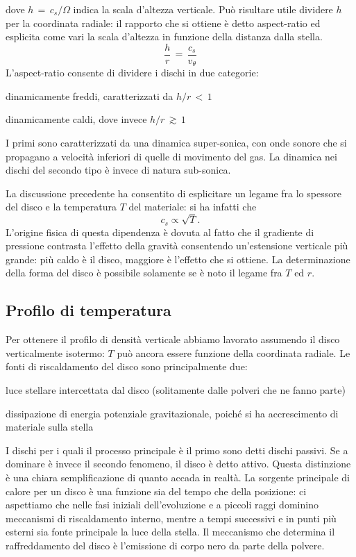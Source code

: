 dove $h\,=\,c_s/\Omega$ indica la scala d'altezza verticale. Può risultare utile dividere $h$ per la coordinata radiale: il rapporto che si ottiene è detto aspect-ratio ed esplicita come vari la scala d'altezza in funzione della distanza dalla stella.
\begin{equation}
\frac{h}{r}\,=\,\frac{c_s}{v_\theta}
\label{eq:aspect_ratio}
\end{equation}
L'aspect-ratio consente di dividere i dischi in due categorie:
\begin{list}{\textbf{-}}{\setlength{\itemsep}{0cm}}
    \item dinamicamente freddi, caratterizzati da $h/r\,<\,1$
    \item dinamicamente caldi, dove invece $h/r\,\gtrsim\,1$
\end{list}
I primi sono caratterizzati da una dinamica super-sonica, con onde sonore che si propagano a velocità inferiori di quelle di movimento del gas. La dinamica nei dischi del secondo tipo è invece di natura sub-sonica.

La discussione precedente ha consentito di esplicitare un legame fra lo spessore del disco e la temperatura $T$ del materiale: si ha infatti che
\begin{equation}
c_s \propto \sqrt{T}.
\label{eq:vsuono_T}
\end{equation}
L'origine fisica di questa dipendenza è dovuta al fatto che il gradiente di pressione contrasta l'effetto della gravità consentendo un'estensione verticale più grande: più caldo è il disco, maggiore è l'effetto che si ottiene. La determinazione della forma del disco è possibile solamente se è noto il legame fra $T$ ed $r$.

\subsection{Profilo di temperatura}

Per ottenere il profilo di densità verticale abbiamo lavorato assumendo il disco verticalmente isotermo: $T$ può ancora essere funzione della coordinata radiale.
Le fonti di riscaldamento del disco sono principalmente due:
\begin{list}{\textbf{-}}{\setlength{\itemsep}{0cm}}
    \item luce stellare intercettata dal disco (solitamente dalle polveri che ne fanno parte)
    \item dissipazione di energia potenziale gravitazionale, poiché si ha accrescimento di materiale sulla stella
\end{list}
I dischi per i quali il processo principale è il primo sono detti dischi passivi. Se a dominare è invece il secondo fenomeno, il disco è detto attivo.
Questa distinzione è una chiara semplificazione di quanto accada in realtà. La sorgente principale di calore per un disco è una funzione sia del tempo che della posizione: ci aspettiamo che nelle fasi iniziali dell'evoluzione e a piccoli raggi dominino meccanismi di riscaldamento interno, mentre a tempi successivi e in punti più esterni sia fonte principale la luce della stella. Il meccanismo che determina il raffreddamento del disco è l'emissione di corpo nero da parte della polvere.


